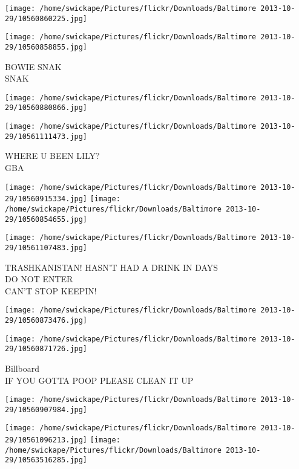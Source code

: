 \documentclass[10pt,letterpaper]{article}
\begin{document}
\texttt{[image: /home/swickape/Pictures/flickr/Downloads/Baltimore 2013-10-29/10560860225.jpg]}

\vspace{0.25in}
\texttt{[image: /home/swickape/Pictures/flickr/Downloads/Baltimore 2013-10-29/10560858855.jpg]}

BOWIE SNAK\\
SNAK
\pagebreak

\texttt{[image: /home/swickape/Pictures/flickr/Downloads/Baltimore 2013-10-29/10560880866.jpg]}

\vspace{0.25in}
\texttt{[image: /home/swickape/Pictures/flickr/Downloads/Baltimore 2013-10-29/10561111473.jpg]}

WHERE U BEEN LILY?\\
GBA
\pagebreak

\texttt{[image: /home/swickape/Pictures/flickr/Downloads/Baltimore 2013-10-29/10560915334.jpg]}
\texttt{[image: /home/swickape/Pictures/flickr/Downloads/Baltimore 2013-10-29/10560854655.jpg]}

\vspace{0.25in}
\texttt{[image: /home/swickape/Pictures/flickr/Downloads/Baltimore 2013-10-29/10561107483.jpg]}

TRASHKANISTAN! HASN'T HAD A DRINK IN DAYS\\
DO NOT ENTER\\
CAN'T STOP KEEPIN!
\pagebreak

\texttt{[image: /home/swickape/Pictures/flickr/Downloads/Baltimore 2013-10-29/10560873476.jpg]}

\vspace{0.25in}
\texttt{[image: /home/swickape/Pictures/flickr/Downloads/Baltimore 2013-10-29/10560871726.jpg]}

Billboard\\
IF YOU GOTTA POOP PLEASE CLEAN IT UP
\pagebreak

\texttt{[image: /home/swickape/Pictures/flickr/Downloads/Baltimore 2013-10-29/10560907984.jpg]}

\vspace{0.25in}
\texttt{[image: /home/swickape/Pictures/flickr/Downloads/Baltimore 2013-10-29/10561096213.jpg]}
\texttt{[image: /home/swickape/Pictures/flickr/Downloads/Baltimore 2013-10-29/10563516285.jpg]}
\end{document}
